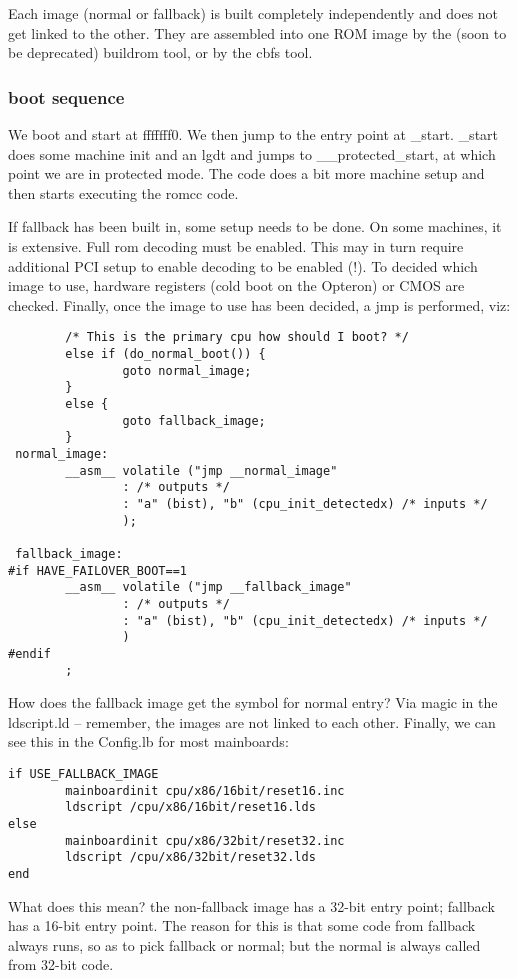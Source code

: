 \documentclass[titlepage,12pt]{article}
\begin{document}
Each image (normal or fallback) is built completely independently and does not get linked to the other. They are assembled into one ROM image by the (soon to be deprecated) buildrom tool, or by the cbfs tool. 

\subsubsection{boot sequence}
We boot and start at fffffff0. We then jump to the entry point at \_start.  \_start does some machine init and an lgdt and jumps to \_\_protected\_start, at which point we are in protected mode. The code does a bit more machine setup and then starts executing the romcc code. 

If fallback has been built in, some setup needs to be done. On some machines, it is extensive. Full rom decoding must be enabled. This may in turn require additional PCI setup to enable decoding to be enabled (!). To decided which image to use, hardware registers (cold boot on the Opteron) or CMOS are checked. Finally, once the image to use has been decided, a jmp is performed, viz: 
\begin{verbatim}
        /* This is the primary cpu how should I boot? */
        else if (do_normal_boot()) {
                goto normal_image;
        }
        else {
                goto fallback_image;
        }
 normal_image:
        __asm__ volatile ("jmp __normal_image"
                : /* outputs */
                : "a" (bist), "b" (cpu_init_detectedx) /* inputs */
                );

 fallback_image:
#if HAVE_FAILOVER_BOOT==1
        __asm__ volatile ("jmp __fallback_image"
                : /* outputs */
                : "a" (bist), "b" (cpu_init_detectedx) /* inputs */
                )
#endif
        ;
\end{verbatim}
How does the fallback image get the symbol for normal entry? Via magic in the ldscript.ld -- remember, the images are not linked to each other. 
Finally, we can see this in the Config.lb for most mainboards: 
\begin{verbatim}
if USE_FALLBACK_IMAGE
        mainboardinit cpu/x86/16bit/reset16.inc
        ldscript /cpu/x86/16bit/reset16.lds
else
        mainboardinit cpu/x86/32bit/reset32.inc
        ldscript /cpu/x86/32bit/reset32.lds
end
\end{verbatim}
What does this mean? the non-fallback image has a 32-bit entry point; fallback has a 16-bit entry point. The reason for this is that some code from fallback always runs, so as to pick fallback or normal; but the normal is always called from 32-bit code. 
\end{document}
